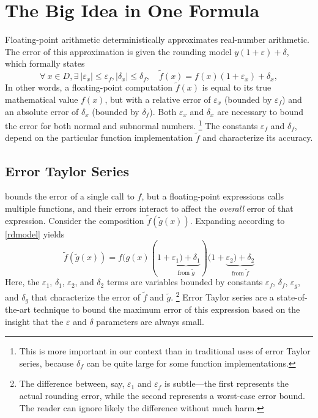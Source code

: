 \documentclass[paper.tex]{subfiles}
\begin{document}
\section{The Big Idea in One Formula}
\label{sec:big-idea}

Floating-point arithmetic deterministically
  approximates real-number arithmetic.
The error of this approximation
  is given the rounding model
  $y(1 + \varepsilon) + \delta$,
  which formally states
\begin{equation}\label{rdmodel}
\forall\:x \in D,
\exists\:|\varepsilon_x| \le \varepsilon_f,
|\delta_x| \le \delta_f,
\quad
\tilde{f}(x) = f(x) (1 + \varepsilon_x) + \delta_x,
\end{equation}
In other words,
  a floating-point computation $\tilde{f}(x)$
  is equal to its true mathematical value $f(x)$,
  but with a relative error of $\varepsilon_x$
  (bounded by $\varepsilon_f$)
  and an absolute error of $\delta_x$
  (bounded by $\delta_f$).
Both $\varepsilon_x$ and $\delta_x$ are necessary
  to bound the error for both normal and subnormal numbers.%
\footnote{This is more important in our context
  than in traditional uses of error Taylor series,
  because $\delta_f$ can be quite large
  for some function implementations.}
The constants $\varepsilon_f$ and $\delta_f$,
  depend on the particular function implementation $\tilde{f}$
  and characterize its accuracy.

\subsection{Error Taylor Series}
\label{ssec:aspec}

 bounds the error of a single call to $f$,
  but a floating-point expressions calls multiple functions,
  and their errors interact to affect
  the \emph{overall} error of that expression.
Consider the composition $\tilde{f}(\tilde{g}(x))$.
Expanding according to \cref{rdmodel} yields
\begin{equation}\label{exfn}
  \tilde{f}(\tilde{g}(x)) = f(g(x)(1 + \underbrace{\varepsilon_1) + \delta_1}_{\text{from }\tilde{g}})(1 + \underbrace{\varepsilon_2) + \delta_2}_{\text{from }\tilde{f}}
\end{equation}
Here, the $\varepsilon_1$, $\delta_1$, $\varepsilon_2$, and $\delta_2$ terms
  are variables bounded by constants $\varepsilon_f$, $\delta_f$, $\varepsilon_g$, and $\delta_g$
  that characterize the error of $\tilde{f}$ and $\tilde{g}$.%
\footnote{The difference between, say, $\varepsilon_1$ and $\varepsilon_f$
  is subtle---the first represents the actual rounding error,
  while the second represents a worst-case error bound.
  The reader can ignore likely the difference without much harm.}
Error Taylor series are a state-of-the-art technique
  to bound the maximum error of this expression
  based on the insight
  that the $\varepsilon$ and $\delta$ parameters are always small.
\end{document}
